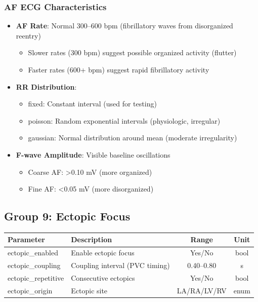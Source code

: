 \documentclass[11pt, a4paper]{article}
\begin{document}
\subsubsection{AF ECG Characteristics}
\begin{itemize}
    \item \textbf{AF Rate}: Normal 300--600 bpm (fibrillatory waves from disorganized reentry)
        \begin{itemize}
            \item Slower rates (300 bpm) suggest possible organized activity (flutter)
            \item Faster rates (600+ bpm) suggest rapid fibrillatory activity
        \end{itemize}
    \item \textbf{RR Distribution}:
    \begin{itemize}
        \item fixed: Constant interval (used for testing)
        \item poisson: Random exponential intervals (physiologic, irregular)
        \item gaussian: Normal distribution around mean (moderate irregularity)
    \end{itemize}
    \item \textbf{F-wave Amplitude}: Visible baseline oscillations
        \begin{itemize}
            \item Coarse AF: >0.10 mV (more organized)
            \item Fine AF: <0.05 mV (more disorganized)
        \end{itemize}
\end{itemize}

\subsection{Group 9: Ectopic Focus}

\begin{tabularx}{\textwidth}{|l|X|c|c|}
\hline
\textbf{Parameter} & \textbf{Description} & \textbf{Range} & \textbf{Unit} \\
\hline
ectopic\_enabled & Enable ectopic focus & Yes/No & bool \\
ectopic\_coupling & Coupling interval (PVC timing) & 0.40--0.80 & s \\
ectopic\_repetitive & Consecutive ectopics & Yes/No & bool \\
ectopic\_origin & Ectopic site & LA/RA/LV/RV & enum \\
\hline
\end{tabularx}
\end{document}
